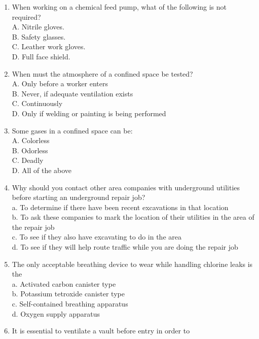 \documentclass[10pt]{article}
\begin{document}
\begin{enumerate}
\begin{enumerate}
\begin{enumerate}
  \item When working on a chemical feed pump, what of the following is not required?\\
A. Nitrile gloves.\\
B. Safety glasses.\\
C. Leather work gloves.\\
D. Full face shield.

  \item When must the atmosphere of a confined space be tested?\\
A. Only before a worker enters\\
B. Never, if adequate ventilation exists\\
C. Continuously\\
D. Only if welding or painting is being performed\\

  \item Some gases in a confined space can be:\\
A. Colorless\\
B. Odorless\\
C. Deadly\\
D. All of the above

  \item Why should you contact other area companies with underground utilities before starting an underground repair job?\\
a. To determine if there have been recent excavations in that location\\
b. To ask these companies to mark the location of their utilities in the area of the repair job\\
c. To see if they also have excavating to do in the area\\
d. To see if they will help route traffic while you are doing the repair job\\

  \item The only acceptable breathing device to wear while handling chlorine leaks is the\\
a. Activated carbon canister type\\
b. Potassium tetroxide canister type\\
c. Self-contained breathing apparatus\\
d. Oxygen supply apparatus\\

  \item It is essential to ventilate a vault before entry in order to\\


\end{enumerate}
\end{enumerate}
\end{enumerate}
\end{document}
